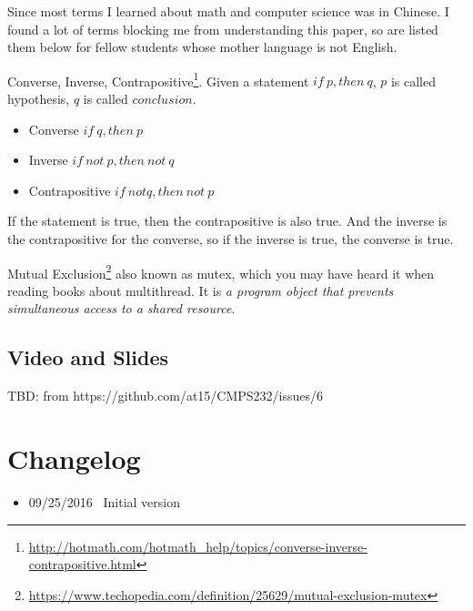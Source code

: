 \documentclass[12pt,a4paper,oneside]{article}
\begin{document}
Since most terms I learned about math and computer science was in Chinese. I found a lot of terms blocking
me from understanding this paper, so are listed them below for fellow students whose mother language is not English.

\medskip


Converse, Inverse, Contrapositive\footnote{\url{http://hotmath.com/hotmath_help/topics/converse-inverse-contrapositive.html}}.
Given a statement $if\ p, then\ q$, $p$ is called hypothesis, $q$ is called $conclusion$.

\begin{itemize}
    \item Converse  $if\ q, then\ p$
    \item Inverse $if\ not\ p, then\ not\ q$
    \item Contrapositive $if\ not q, then\ not\ p$
\end{itemize}

If the statement is true, then the contrapositive is also true.
And the inverse is the contrapositive for the converse, so if the inverse is true, the converse is true.

\medskip

Mutual Exclusion\footnote{\url{https://www.techopedia.com/definition/25629/mutual-exclusion-mutex}}
also known as mutex, which you may have heard it when reading books about multithread.
It is \textit{a program object that prevents simultaneous access to a shared resource}.

\subsection{Video and Slides}

TBD: from https://github.com/at15/CMPS232/issues/6

\section{Changelog}

\begin{itemize}
  \item 09/25/2016 \ Initial version
\end{itemize}

\printbibliography
\end{document}

